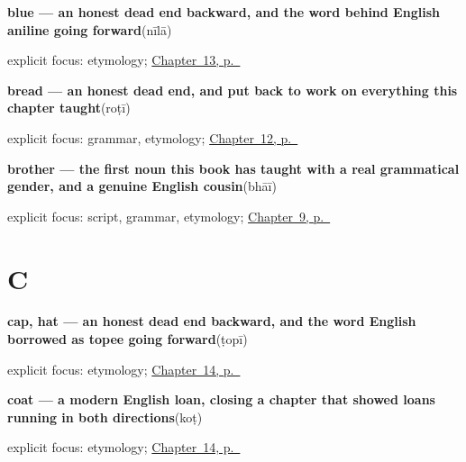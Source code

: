 \noindent\begin{minipage}[t]{\linewidth}
\raggedright
\textbf{blue — an honest dead end backward, and the word behind English aniline going forward}\enspace\emph{}\enspace(nīlā)\par
\footnotesize explicit focus: etymology; \hyperref[ch:ur-colors]{Chapter~13, p.~\pageref*{ch:ur-colors}}
\end{minipage}\par\smallskip

\noindent\begin{minipage}[t]{\linewidth}
\raggedright
\textbf{bread — an honest dead end, and  put back to work on everything this chapter taught}\enspace\emph{}\enspace(roṭī)\par
\footnotesize explicit focus: grammar, etymology; \hyperref[ch:ur-food-words]{Chapter~12, p.~\pageref*{ch:ur-food-words}}
\end{minipage}\par\smallskip

\noindent\begin{minipage}[t]{\linewidth}
\raggedright
\textbf{brother — the first noun this book has taught with a real grammatical gender, and a genuine English cousin}\enspace\emph{}\enspace(bhāī)\par
\footnotesize explicit focus: script, grammar, etymology; \hyperref[ch:ur-people]{Chapter~9, p.~\pageref*{ch:ur-people}}
\end{minipage}\par\smallskip

\section*{C}

\noindent\begin{minipage}[t]{\linewidth}
\raggedright
\textbf{cap, hat — an honest dead end backward, and the word English borrowed as topee going forward}\enspace\emph{}\enspace(ṭopī)\par
\footnotesize explicit focus: etymology; \hyperref[ch:ur-clothing]{Chapter~14, p.~\pageref*{ch:ur-clothing}}
\end{minipage}\par\smallskip

\noindent\begin{minipage}[t]{\linewidth}
\raggedright
\textbf{coat — a modern English loan, closing a chapter that showed loans running in both directions}\enspace\emph{}\enspace(koṭ)\par
\footnotesize explicit focus: etymology; \hyperref[ch:ur-clothing]{Chapter~14, p.~\pageref*{ch:ur-clothing}}
\end{minipage}\par\smallskip

